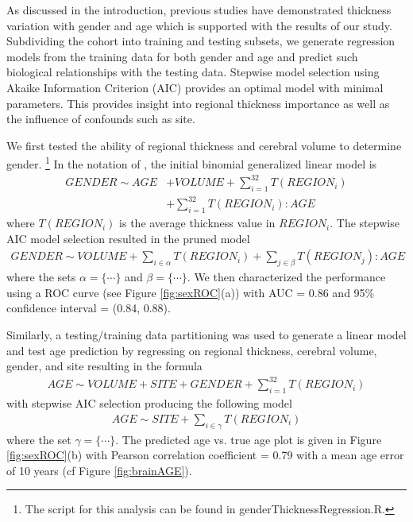 As discussed in the introduction, previous studies have demonstrated 
thickness variation with gender and age which is supported with
the results of our study.  Subdividing the cohort into training and
testing subsets, we generate regression models from the training data
for both gender and age and predict such biological relationships with 
the testing data. Stepwise model selection using Akaike Information Criterion
(AIC) provides an optimal model with minimal parameters.  This provides 
insight into regional thickness importance as well
as the influence of confounds such as site.

We first tested the ability of regional thickness and cerebral volume to determine
gender.%
\footnote{
The script for this analysis can be found in genderThicknessRegression.R.
}
In the notation of \cite{wilkinson1973}, the initial binomial 
generalized linear model is
\begin{align}
  GENDER \sim AGE &+ VOLUME + \sum_{i=1}^{32} T(REGION_{i}) \\ \nonumber
              &+\sum_{i=1}^{32} T(REGION_{i}):AGE
\end{align}
where $T(REGION_{i})$ is the average thickness value in $REGION_{i}$.
The stepwise AIC model selection resulted in the pruned model
\begin{align}
  \label{eq:roc}
  GENDER \sim VOLUME + \sum_{i \in \alpha} T(REGION_i) + \sum_{j \in \beta} T(REGION_j):AGE
\end{align}
where the sets $\alpha = \{\cdots\}$ and $\beta = \{\cdots\}$.  We then characterized the performance using a ROC curve (see Figure \ref{fig:sexROC}(a)) with AUC = 0.86 and 95\% confidence interval = (0.84, 0.88). 
   
Similarly, a testing/training data partitioning was used to generate a linear model 
and test age prediction by regressing on regional thickness,
cerebral volume, gender, and site resulting in the formula
\begin{align}
  AGE \sim VOLUME + SITE + GENDER + \sum_{i=1}^{32} T(REGION_{i})
\end{align}
with stepwise AIC selection producing the following model
\begin{align}
  AGE \sim SITE + \sum_{i\in\gamma} T(REGION_{i})
\end{align}
where the set $\gamma = \{\cdots\}$.  The predicted age vs. true age plot is given
in Figure \ref{fig:sexROC}(b) with Pearson correlation coefficient = 0.79 with a mean
age error of 10 years (cf Figure \ref{fig:brainAGE}).


